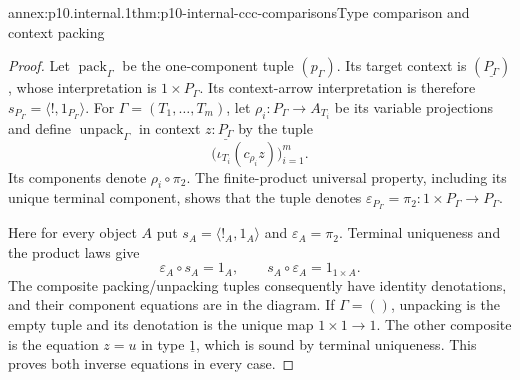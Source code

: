 \begin{annexitem}{annex:p10.internal.1}{thm:p10-internal-ccc-comparisons}{Type comparison and context packing}
\begin{proof}
Let \(\operatorname{pack}_\Gamma\) be the one-component tuple
\((p_\Gamma)\).
Its target context is \((\underline{P_\Gamma})\), whose interpretation
is \(1\times P_\Gamma\).  Its context-arrow interpretation is
therefore \(s_{P_\Gamma}=\langle!,1_{P_\Gamma}\rangle\).
For \(\Gamma=(T_1,\ldots,T_m)\), let
\(\rho_i:P_\Gamma\to A_{T_i}\) be its variable projections and define
\(\operatorname{unpack}_\Gamma\) in context
\(z:\underline{P_\Gamma}\) by the tuple
\[
 \bigl(\iota_{T_i}(c_{\rho_i}z)\bigr)_{i=1}^m.
\]
Its components denote \(\rho_i\circ\pi_2\).
The finite-product universal property, including its unique terminal
component, shows that the tuple denotes
\(\varepsilon_{P_\Gamma}=\pi_2:1\times P_\Gamma\to P_\Gamma\).

Here for every object \(A\) put
\(s_A=\langle!_A,1_A\rangle\) and \(\varepsilon_A=\pi_2\).
Terminal uniqueness and the product laws give
\[
 \varepsilon_A\circ s_A=1_A,\qquad
 s_A\circ\varepsilon_A=1_{1\times A}.
\]
The composite packing/unpacking tuples consequently have identity
denotations, and their component equations are in the diagram.
If \(\Gamma=()\), unpacking is the empty tuple and its denotation
is the unique map \(1\times1\to1\).
The other composite is the equation \(z=u\) in type \(\underline1\),
which is sound by terminal uniqueness.  This proves both inverse
equations in every case.
\end{proof}
\end{annexitem}

